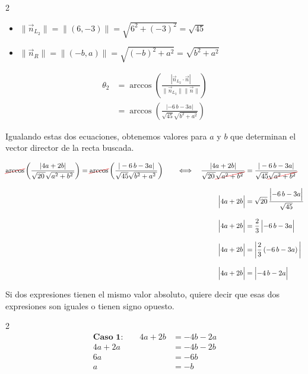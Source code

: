 \documentclass[11pt]{article}
\newcommand{\Cancelar}[2][black]{{\color{#1}\cancel{\color{black}#2}}}%
\begin{document}
\begin{enumerate}[\hspace{-5mm} 1) ]
\begin{multicols}{2}
\begin{itemize}
    \item $\|\vec{n}_{L_2}\| = \| (6,- 3) \| = \sqrt{6^2 + (-3)^2} = \sqrt{45} $

    \item $\|\vec{n}_{R}\|= \| (-b,a) \| = \sqrt{(-b)^2 + a^2} = \sqrt{b^2+a^2}$

    
\end{itemize}
\begin{align*}
    \theta_2 &= \arccos\left( \frac{|\vec{n}_{L_2} \cdot \vec{n}|}{\|\vec{n}_{L_2}\| \|\vec{n}\|} \right)
    \\[2mm]
    &= \arccos\left( \frac{|-6 \, b -3a|}{\sqrt{45} \sqrt{b^2 + a^2}}  \right)
\end{align*}


\end{multicols}

Igualando estas dos ecuaciones, obtenemos valores para $a$ y $b$ que determinan el vector director de la recta buscada.

\begin{align*}
    \Cancelar[red]{\arccos} \left( \frac{|4a + 2b|}{\sqrt{20\,} \sqrt{a^2 + b^2\,}}  \right) 
    =
    \Cancelar[red]{\arccos}\left( \frac{|-6 \, b -3a|}{\sqrt{45} \sqrt{b^2 + a^2\,}}  \right)
    \qquad\Longleftrightarrow\quad
      \frac{|4a + 2b|}{\sqrt{20\,}\Cancelar[red]{\sqrt{a^2 + b^2\,}}}
    &=
    \frac{|-6 \, b -3a|}{\sqrt{45}\Cancelar[red]{ \sqrt{a^2 + b^2\,}}}
    \\[3mm]
       \left|4a + 2b \rule{0mm}{4mm} \right|    
    &=
    \sqrt{20 } \, \frac{\left|-6 \, b -3a \rule{0mm}{4mm} \right|}{\sqrt{45}}
    \\[3mm]
     \left|4a + 2b \rule{0mm}{4mm} \right|    
    &=
     \frac{2}{3} \left|-6 \, b -3 a\rule{0mm}{4mm} \right|
     \\[3mm]
     \left|4a + 2b \rule{0mm}{4mm} \right|    
    &=
      \left|\frac{2}{3}  \left( -6 \, b -3 a  \right)\rule{0mm}{4mm} \right|
    \\[3mm]
     \left|4a + 2b \rule{0mm}{4mm} \right|    
    &=
      \left|    -4 \, b -2 a  \rule{0mm}{4mm} \right|
\end{align*}

Si dos expresiones tienen el mismo valor absoluto, quiere decir que esas dos expresiones son iguales o tienen signo opuesto.
%
%

\vspace{-9mm}\begin{multicols}{2}  
\begin{align*}
\textbf{Caso 1:}\qquad   4a + 2b &= -4b - 2a  
  \\[3mm]
   4a +2a   &= -4b -  2b
   \\[3mm]
   6a &= -6 b
   \\[3mm]
   a &= -b
\end{align*} 
  

\end{multicols}
\end{enumerate}
\end{document}
